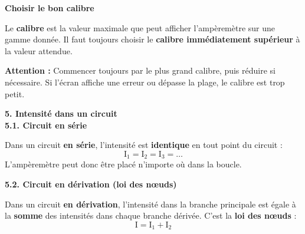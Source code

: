 \documentclass[11pt,a4paper]{article}
\begin{document}
\textbf{Choisir le bon calibre}

\begin{tcolorbox}[colback=red!5!white,colframe=red!75!black]
{
Le \textbf{calibre} est la valeur maximale que peut afficher l'ampèremètre sur une gamme donnée. Il faut toujours choisir le \textbf{calibre immédiatement supérieur} à la valeur attendue.
}
\end{tcolorbox}

\textbf{Attention : } Commencer toujours par le plus grand calibre, puis réduire si nécessaire. Si l'écran affiche une erreur ou dépasse la plage, le calibre est trop petit. \\

\vfill

\newpage

\textbf{5. Intensité dans un circuit} \\

\textbf{5.1. Circuit en série}

\begin{tcolorbox}[colback=red!5!white,colframe=red!75!black]
{
Dans un circuit \textbf{en série}, l'intensité est \textbf{identique} en tout point du circuit :
$$\mathrm{I}_1 = \mathrm{I}_2 = \mathrm{I}_3 = \ldots$$
L'ampèremètre peut donc être placé n'importe où dans la boucle.
}
\end{tcolorbox}

\vfill

\textbf{5.2. Circuit en dérivation (loi des nœuds)}

\begin{tcolorbox}[colback=red!5!white,colframe=red!75!black]
{
Dans un circuit \textbf{en dérivation}, l'intensité dans la branche principale est égale à la \textbf{somme} des intensités dans chaque branche dérivée. C'est la \textbf{loi des nœuds} :
$$\mathrm{I} = \mathrm{I}_1 + \mathrm{I}_2$$
\begin{center}
\end{center}
}
\end{tcolorbox}
\end{document}
